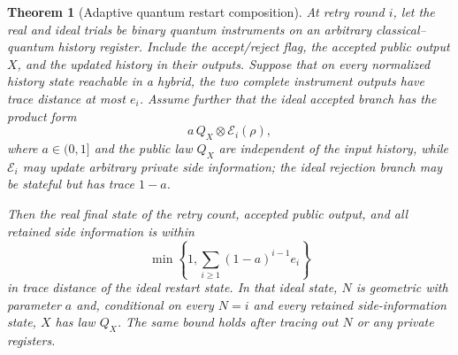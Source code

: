 \documentclass[pdflatex,sn-mathphys-num]{sn-jnl}
\theoremstyle{thmstyleone}
\newtheorem{theorem}{Theorem}[section]
\theoremstyle{thmstyletwo}
\begin{document}
\begin{theorem}[Adaptive quantum restart composition]
\label{thm:qrom-retry}
At retry round $i$, let the real and ideal trials be binary quantum
instruments on an arbitrary classical--quantum history register.  Include the
accept/reject flag, the accepted public output $X$, and the updated history in
their outputs.  Suppose that on every normalized history state reachable in a
hybrid, the two complete instrument outputs have trace distance at most $e_i$.
Assume further that the ideal accepted branch has the product form
\begin{equation}
 a\,Q_X\otimes\mathcal E_i(\rho),                    \label{eq:qideal-branch}
\end{equation}
where $a\in(0,1]$ and the public law $Q_X$ are independent of the input
history, while $\mathcal E_i$ may update arbitrary private side information;
the ideal rejection branch may be stateful but has trace $1-a$.

Then the real final state of the retry count, accepted public output, and all
retained side information is within
\begin{equation}
 \min\!\left\{1,\sum_{i\ge1}(1-a)^{i-1}e_i\right\}   \label{eq:qretry-weighted}
\end{equation}
in trace distance of the ideal restart state.  In that ideal state, $N$ is
geometric with parameter $a$ and, conditional on every $N=i$ and every
retained side-information state, $X$ has law $Q_X$.  The same bound holds
after tracing out $N$ or any private registers.
\end{theorem}
\end{document}
